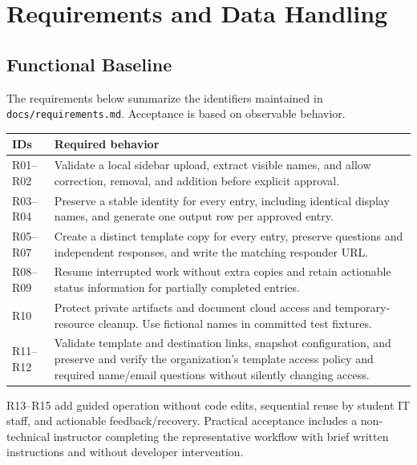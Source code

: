 \section{Requirements and Data Handling}
\subsection{Functional Baseline}
The requirements below summarize the identifiers maintained in
\texttt{docs/requirements.md}. Acceptance is based on observable behavior.

\begin{center}
\renewcommand{\arraystretch}{1.2}
\begin{tabularx}{\textwidth}{l X}
\hline
\textbf{IDs} & \textbf{Required behavior} \\
\hline
R01--R02 & Validate a local sidebar upload, extract visible names, and allow
correction, removal, and addition before explicit approval. \\
R03--R04 & Preserve a stable identity for every entry, including identical
display names, and generate one output row per approved entry. \\
R05--R07 & Create a distinct template copy for every entry, preserve questions
and independent responses, and write the matching responder URL. \\
R08--R09 & Resume interrupted work without extra copies and retain actionable
status information for partially completed entries. \\
R10 & Protect private artifacts and document cloud access and temporary-resource
cleanup. Use fictional names in committed test fixtures. \\
R11--R12 & Validate template and destination links, snapshot configuration, and
preserve and verify the organization's template access policy and required name/email questions without silently changing access. \\
\hline
\end{tabularx}
\par\smallskip
R13--R15 add guided operation without code edits, sequential reuse by student IT staff,
and actionable feedback/recovery. Practical acceptance includes a non-technical
instructor completing the representative workflow with brief written instructions
and without developer intervention.
\end{center}

